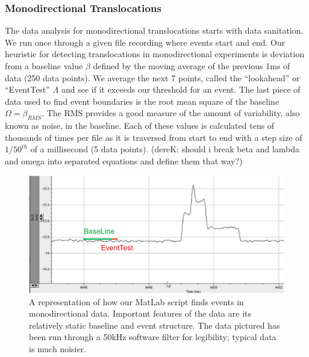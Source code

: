 \documentclass[aps,prl,preprint,groupedaddress]{revtex4}
\begin{document}
\subsubsection{Monodirectional Translocations}

The data analysis for monodirectional translocations starts with data sanitation.
We run once through a given file recording where events start and end.
Our heuristic for detecting translocations in monodirectional experiments is deviation from a baseline value \(\beta\) defined by the moving average of the previous 1ms of data (250 data points).
We average the next 7 points, called the ``lookahead'' or ``EventTest'' \(\Lambda\) and see if it exceeds our threshold for an event.
The last piece of data used to find event boundaries is the root mean square of the baseline \(\Omega = \beta_{RMS}\).
The RMS provides a good measure of the amount of variability, also known as noise, in the baseline.
Each of these values is calculated tens of thousands of times per file as it is traversed from start to end with a step size of \(1/50^{th}\) of a millisecond (5 data points). (dereK: should i break beta and lambda and omega into separated equations and define them that way?)
\begin{figure}[h]
\centering
\includegraphics[width=.8\textwidth]{figures/find-events}
\caption{A representation of how our MatLab script finds events in monodirectional data. Important features of the data are its relatively static baseline and event structure. The data pictured has been run through a 50kHz software filter for legibility; typical data is much noisier.}
\label{fig:find-events}
\end{figure}
\end{document}
